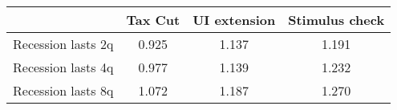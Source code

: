 \begin{tabular}{@{}lccc@{}} 
\toprule 
& Tax Cut    & UI extension    & Stimulus check    \\  \midrule 
Recession lasts 2q &0.925  & 1.137  & 1.191     \\ 
Recession lasts 4q &0.977  & 1.139  & 1.232     \\ 
Recession lasts 8q &1.072  & 1.187  & 1.270     \\ 
\end{tabular}  

